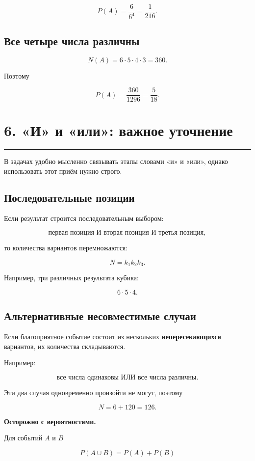 \documentclass[a4paper,12pt]{article}
\newcommand{\sectionline}{%
    \vspace{0.2em}
    {\color{accent}\rule{\linewidth}{0.7pt}}
    \vspace{0.4em}
}
\newcommand{\important}[1]{%
    \par\smallskip
    {\color{darkaccent}\textbf{#1}}
    \par\smallskip
}
\begin{document}
\[
\boxed{
P(A)=\frac6{6^4}=\frac1{216}
}.
\]

\subsection*{Все четыре числа различны}

\[
N(A)=6\cdot5\cdot4\cdot3=360.
\]

Поэтому

\[
\boxed{
P(A)=\frac{360}{1296}=\frac5{18}
}.
\]

\newpage

\section*{6. «И» и «или»: важное уточнение}
\sectionline

В задачах удобно мысленно связывать этапы словами «и» и «или», однако использовать этот приём нужно строго.

\subsection*{Последовательные позиции}

Если результат строится последовательным выбором:

\[
\text{первая позиция И вторая позиция И третья позиция},
\]

то количества вариантов перемножаются:

\[
N=k_1k_2k_3.
\]

Например, три различных результата кубика:

\[
6\cdot5\cdot4.
\]

\subsection*{Альтернативные несовместимые случаи}

Если благоприятное событие состоит из нескольких \textbf{непересекающихся} вариантов, их количества складываются.

Например:

\[
\text{все числа одинаковы ИЛИ все числа различны}.
\]

Эти два случая одновременно произойти не могут, поэтому

\[
N=6+120=126.
\]

\important{Осторожно с вероятностями.}

Для событий \(A\) и \(B\)

\[
P(A\cup B)=P(A)+P(B)
\]
\end{document}
